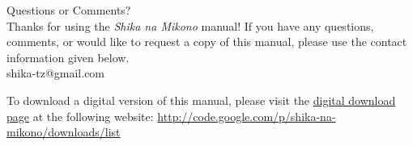 \begin{center}
{\Huge Questions or Comments?}\\[12pt]
Thanks for using the \textit{Shika na Mikono} manual! If you have any questions, comments, or would like to request a copy of this manual, please use the contact information given below.\\[20pt]
shika-tz@gmail.com
\end{center}
\vfill
To download a digital version of this manual, please visit the \href{http://code.google.com/p/shika-na-mikono/downloads/list}{digital download page} at the following website: \url{http://code.google.com/p/shika-na-mikono/downloads/list}